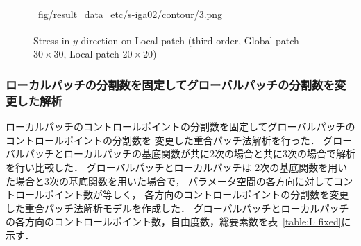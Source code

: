 \begin{figure}[hbtp]
\begin{tabular}{cc}
\begin{minipage}[t]{0.45\hsize}
      {fig/result_data_etc/s-iga02/contour/3.png}
      \caption{Stress in $y$ direction on Local patch (third-order, Global patch $30\times 30$, Local patch $20\times 20$)}
      \label{fig:s-iga02 y 3}
    \end{minipage}
  \end{tabular}
\end{figure}

\newpage

\subsubsection{ローカルパッチの分割数を固定してグローバルパッチの分割数を変更した解析}
ローカルパッチのコントロールポイントの分割数を固定してグローバルパッチのコントロールポイントの分割数を
変更した重合パッチ法解析を行った．
グローバルパッチとローカルパッチの基底関数が共に2次の場合と共に3次の場合で解析を行い比較した．
グローバルパッチとローカルパッチは
2次の基底関数を用いた場合と3次の基底関数を用いた場合で，
パラメータ空間の各方向に対してコントロールポイント数が等しく，
各方向のコントロールポイントの分割数を変更した重合パッチ法解析モデルを作成した．
グローバルパッチとローカルパッチの各方向のコントロールポイント数，自由度数，総要素数を表~\ref{table:L fixed}に示す．

\begin{table}[hbtp]
  \caption{Details of S-IGA analytical model (Local patch division is fixed)}
  \label{table:L fixed}
  \centering
\end{table}

